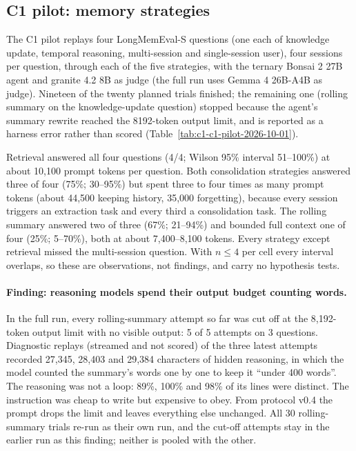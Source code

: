 \subsection{C1 pilot: memory strategies}
\label{sec:results-c1}

The C1 pilot replays four LongMemEval-S questions (one each of knowledge update, temporal reasoning,
multi-session and single-session user), four sessions per question, through each of the five strategies,
with the ternary Bonsai 2 27B agent and granite 4.2 8B as judge (the full run uses Gemma 4 26B-A4B as
judge). Nineteen of the twenty planned trials finished; the remaining one (rolling summary on the
knowledge-update question) stopped because the agent's summary rewrite reached the 8192-token output
limit, and is reported as a harness error rather than scored (Table~\ref{tab:c1-c1-pilot-2026-10-01}).

Retrieval answered all four questions (4/4; Wilson 95\% interval 51--100\%) at about 10{,}100 prompt
tokens per question. Both consolidation strategies answered three of four (75\%; 30--95\%) but spent
three to four times as many prompt tokens (about 44{,}500 keeping history, 35{,}000 forgetting), because
every session triggers an extraction task and every third a consolidation task. The rolling summary
answered two of three (67\%; 21--94\%) and bounded full context one of four (25\%; 5--70\%), both at about
7{,}400--8{,}100 tokens. Every strategy except retrieval missed the multi-session question. With $n \le 4$ per cell every interval overlaps, so these are \pilot{} observations,
not findings, and carry no hypothesis tests.

\paragraph{Finding: reasoning models spend their output budget counting words.} In the full run, every
rolling-summary attempt so far was cut off at the 8{,}192-token output limit with no visible output: 5 of
5 attempts on 3 questions. Diagnostic replays (streamed and not scored) of the three latest attempts
recorded 27{,}345, 28{,}403 and 29{,}384 characters of hidden reasoning, in which the model counted the
summary's words one by one to keep it ``under 400 words''. The reasoning was not a loop: 89\%, 100\% and
98\% of its lines were distinct. The instruction was cheap to write but expensive to obey. From protocol
v0.4 the prompt drops the limit and leaves everything else unchanged. All 30 rolling-summary trials re-run
as their own run, and the cut-off attempts stay in the earlier run as this finding; neither is pooled with
the other.
